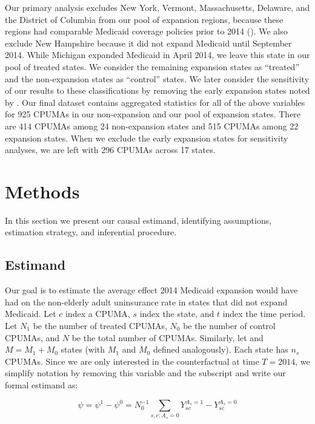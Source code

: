 \documentclass[12pt]{article}
\begin{document}
Our primary analysis excludes New York, Vermont, Massachusetts, Delaware, and the District of Columbia from our pool of expansion regions, because these regions had comparable Medicaid coverage policies prior to 2014 (\cite{kaestner2017effects}). We also exclude New Hampshire because it did not expand Medicaid until September 2014. While Michigan expanded Medicaid in April 2014, we leave this state in our pool of treated states. We consider the remaining expansion states as ``treated'' and the non-expansion states as ``control'' states. We later consider the sensitivity of our results to these classifications by removing the early expansion states noted by \cite{frean2017premium}. Our final dataset contains aggregated statistics for all of the above variables for 925 CPUMAs in our non-expansion and our pool of expansion states. There are 414 CPUMAs among 24 non-expansion states and 515 CPUMAs among 22 expansion states. When we exclude the early expansion states for sensitivity analyses, we are left with 296 CPUMAs across 17 states.

\section{Methods}
\label{sec:methods}

In this section we present our causal estimand, identifying assumptions, estimation strategy, and inferential procedure.

\subsection{Estimand}

Our goal is to estimate the average effect 2014 Medicaid expansion would have had on the non-elderly adult uninsurance rate in states that did not expand Medicaid. Let $c$ index a CPUMA, $s$ index the state, and $t$ index the time period. Let $N_1$ be the number of treated CPUMAs, $N_0$ be the number of control CPUMAs, and $N$ be the total number of CPUMAs. Similarly, let and $M = M_1 + M_0$ states (with $M_1$ and $M_0$ defined analogously). Each state has $n_s$ CPUMAs. Since we are only interested in the counterfactual at time $T = 2014$, we simplify notation by removing this variable and the subscript and write our formal estimand as:

$$
\psi = \psi^1 - \psi^0 = N_0^{-1}\sum_{s, c: A_s = 0} Y_{sc}^{A_s = 1} - Y_{sc}^{A_s = 0}
$$
\end{document}
